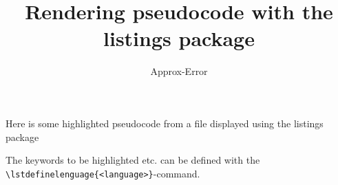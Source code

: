 \documentclass{article}
\title{Rendering pseudocode with the listings package}
\author{Approx-Error}
\begin{document}
    \normalsize
    \maketitle

    Here is some highlighted pseudocode from a file displayed using the listings package

    

    The keywords to be highlighted etc. can be defined with the \texttt{\textbackslash lstdefinelenguage\{<language>\}}-command.
    
\end{document}
